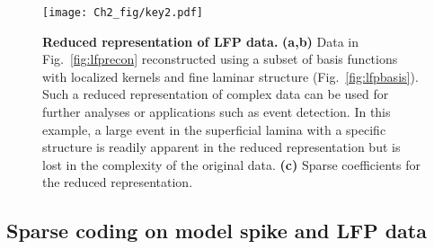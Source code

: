 \begin{figure}[htp!]
  \centering
  \texttt{[image: Ch2\_fig/key2.pdf]}
  \caption{\textbf{Reduced representation of LFP data.}
    \textbf{(a,b)} Data in Fig.~\ref{fig:lfprecon} reconstructed using
    a subset of basis functions with localized kernels and fine
    laminar structure (Fig.~\ref{fig:lfpbasis}). Such a reduced
    representation of complex data can be used for further analyses or
    applications such as event detection. In this example, a large
    event in the superficial lamina with a specific structure is
    readily apparent in the reduced representation but is lost in the
    complexity of the original data. \textbf{(c)} Sparse coefficients
    for the reduced representation.}
  \label{fig:denoisinglfp}
\end{figure}




\subsection{Sparse coding on model spike and LFP data}
\label{sec:modelspike}

